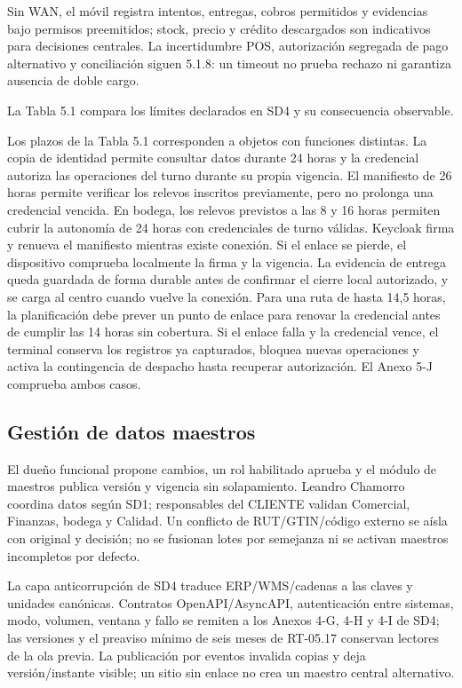 Sin WAN, el móvil registra intentos, entregas, cobros permitidos y evidencias bajo permisos preemitidos; stock, precio y crédito descargados son indicativos para decisiones centrales. La incertidumbre POS, autorización segregada de pago alternativo y conciliación siguen 5.1.8: un timeout no prueba rechazo ni garantiza ausencia de doble cargo.

La Tabla 5.1 compara los límites declarados en SD4 y su consecuencia observable.


Los plazos de la Tabla 5.1 corresponden a objetos con funciones distintas. La copia de identidad permite consultar datos durante 24 horas y la credencial autoriza las operaciones del turno durante su propia vigencia. El manifiesto de 26 horas permite verificar los relevos inscritos previamente, pero no prolonga una credencial vencida. En bodega, los relevos previstos a las 8 y 16 horas permiten cubrir la autonomía de 24 horas con credenciales de turno válidas. Keycloak firma y renueva el manifiesto mientras existe conexión. Si el enlace se pierde, el dispositivo comprueba localmente la firma y la vigencia. La evidencia de entrega queda guardada de forma durable antes de confirmar el cierre local autorizado, y se carga al centro cuando vuelve la conexión. Para una ruta de hasta 14,5 horas, la planificación debe prever un punto de enlace para renovar la credencial antes de cumplir las 14 horas sin cobertura. Si el enlace falla y la credencial vence, el terminal conserva los registros ya capturados, bloquea nuevas operaciones y activa la contingencia de despacho hasta recuperar autorización. El Anexo 5-J comprueba ambos casos.

\subsection{Gestión de datos maestros}
\label{sec:sd5-5-2-4}

El dueño funcional propone cambios, un rol habilitado aprueba y el módulo de maestros publica versión y vigencia sin solapamiento. Leandro Chamorro coordina datos según SD1; responsables del CLIENTE validan Comercial, Finanzas, bodega y Calidad. Un conflicto de RUT/GTIN/código externo se aísla con original y decisión; no se fusionan lotes por semejanza ni se activan maestros incompletos por defecto.

La capa anticorrupción de SD4 traduce ERP/WMS/cadenas a las claves y unidades canónicas. Contratos OpenAPI/AsyncAPI, autenticación entre sistemas, modo, volumen, ventana y fallo se remiten a los Anexos 4-G, 4-H y 4-I de SD4; las versiones y el preaviso mínimo de seis meses de RT-05.17 conservan lectores de la ola previa. La publicación por eventos invalida copias y deja versión/instante visible; un sitio sin enlace no crea un maestro central alternativo.

